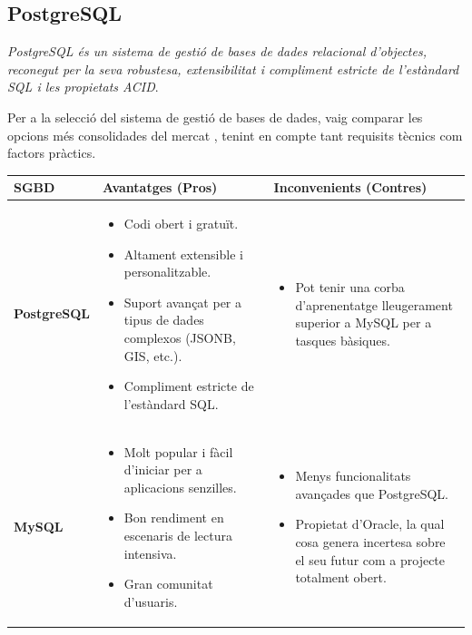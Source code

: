 \subsection{\postgresslogo\hspace{0.5em}PostgreSQL}
\textit{PostgreSQL és un sistema de gestió de bases de dades relacional d'objectes, reconegut per la seva robustesa, extensibilitat i compliment estricte de l'estàndard SQL i les propietats ACID}.

Per a la selecció del sistema de gestió de bases de dades, vaig comparar les opcions més consolidades del mercat \cite{dbengines-comparison}, tenint en compte tant requisits tècnics com factors pràctics.

\begin{table}[h]
\centering
\begin{tabular}{|l|p{4.5cm}|p{4.5cm}|}
\hline
\textbf{SGBD} & \textbf{Avantatges (Pros)} & \textbf{Inconvenients (Contres)} \\
\hline
\textbf{PostgreSQL} & 
\begin{itemize}
    \item Codi obert i gratuït.
    \item Altament extensible i personalitzable.
    \item Suport avançat per a tipus de dades complexos (JSONB, GIS, etc.).
    \item Compliment estricte de l'estàndard SQL.
\end{itemize} & 
\begin{itemize}
    \item Pot tenir una corba d'aprenentatge lleugerament superior a MySQL per a tasques bàsiques.
\end{itemize} \\
\hline
\textbf{MySQL} & 
\begin{itemize}
    \item Molt popular i fàcil d'iniciar per a aplicacions senzilles.
    \item Bon rendiment en escenaris de lectura intensiva.
    \item Gran comunitat d'usuaris.
\end{itemize} & 
\begin{itemize}
    \item Menys funcionalitats avançades que PostgreSQL.
    \item Propietat d'Oracle, la qual cosa genera incertesa sobre el seu futur com a projecte totalment obert.
\end{itemize} \\

\end{tabular}
\end{table}
